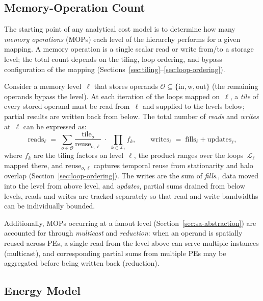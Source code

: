 \subsection{Memory-Operation Count}
\label{sec:mop-count}

The starting point of any analytical cost model is to determine how many
\emph{memory operations} (MOPs) each level of the hierarchy performs for a
given mapping.
A memory operation is a single scalar read or write from/to a storage level;
the total count depends on the tiling, loop ordering, and bypass
configuration of the mapping (Sections~\ref{sec:tiling}--\ref{sec:loop-ordering}).

Consider a memory level~$\ell$ that stores operands $\mathcal{O} \subseteq
\{\text{in}, \text{w}, \text{out}\}$ (the remaining operands bypass the
level).
At each iteration of the loops mapped on~$\ell$, a \emph{tile} of every
stored operand must be read from~$\ell$ and supplied to the levels below;
partial results are written back from below.
The total number of \emph{reads} and \emph{writes} at~$\ell$ can be
expressed as:
\begin{equation}
\label{eq:mops}
\text{reads}_\ell \;=\; \sum_{o \in \mathcal{O}}
  \frac{\text{tile}_{o}}{\text{reuse}_{o,\ell}}
  \;\cdot\; \prod_{k \in \mathcal{L}_\ell} f_k,
\qquad
\text{writes}_\ell \;=\; \text{fills}_\ell + \text{updates}_\ell,
\end{equation}
where $f_k$ are the tiling factors on level~$\ell$, the product ranges over
the loops~$\mathcal{L}_\ell$ mapped there, and $\text{reuse}_{o,\ell}$
captures temporal reuse from stationarity and halo overlap
(Section~\ref{sec:loop-ordering}).
The writes are the sum of \emph{fills}., data moved into the level from above level, and \emph{updates}, partial
sums drained from below levels, reads and writes are tracked separately so that read and write
bandwidths can be individually bounded.

Additionally, MOPs occurring at a fanout level (Section~\ref{sec:sa-abstraction})
are accounted for through \emph{multicast} and \emph{reduction}:
when an operand is spatially reused across PEs, a single read from the
level above can serve multiple instances (multicast), and corresponding
partial sums from multiple PEs may be aggregated before being written back
(reduction).

\subsection{Energy Model}
\label{sec:energy-model}

